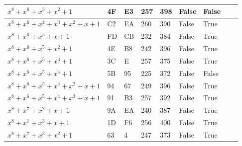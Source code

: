 \begin{footnotesize}
\begin{longtable}{|l|l|l|l|l|l|l|l|l|}
$x^8 + x^6 + x^3 + x^2 + 1$             & 4F            & E3                & 257                 & 398                   & False               & False             &              &                \\ \hline
$x^8 + x^6 + x^4 + x^3 + x^2 + x + 1$   & C2            & EA                & 260                 & 390                   & False               & True              &              &                \\ \hline
$x^8 + x^6 + x^5 + x + 1$               & FD            & CB                & 232                 & 384                   & False               & True              &              &                \\ \hline
$x^8 + x^6 + x^5 + x^2 + 1$             & 4E            & B8                & 242                 & 396                   & False               & True              &              &                \\ \hline
$x^8 + x^6 + x^5 + x^3 + 1$             & 3C            & E                 & 257                 & 375                   & False               & True              &              &                \\ \hline
$x^8 + x^6 + x^5 + x^4 + 1$             & 5B            & 95                & 225                 & 372                   & False               & False             &              &                \\ \hline
$x^8 + x^6 + x^5 + x^4 + x^2 + x + 1$   & 94            & 67                & 249                 & 396                   & False               & True              &              &                \\ \hline
$x^8 + x^6 + x^5 + x^4 + x^3 + x + 1$   & 91            & B3                & 257                 & 392                   & False               & True              &              &                \\ \hline
$x^8 + x^7 + x^2 + x + 1$               & 9A            & EA                & 240                 & 387                   & False               & True              &              &                \\ \hline
$x^8 + x^7 + x^3 + x + 1$               & 1D            & F6                & 256                 & 400                   & False               & True              &              &                \\ \hline
$x^8 + x^7 + x^3 + x^2 + 1$             & 63            & 4                 & 247                 & 373                   & False               & True              &              &                \\ \hline

\end{longtable}
\end{footnotesize}
